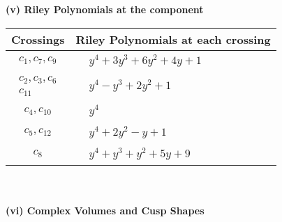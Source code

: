 \documentclass[1p]{elsarticle_modified}
\theoremstyle{definition}
\begin{document}
\newpage\renewcommand{\arraystretch}{1}
\flushleft \textbf{(v) Riley Polynomials at the component}\newline \\
\begin{tabular}{m{50pt}|m{274pt}}
Crossings & \hspace{64pt}Riley Polynomials at each crossing \\
\hline $$\begin{aligned}c_{1},c_{7},c_{9}\end{aligned}$$&$\begin{aligned}
&y^4+3 y^3+6 y^2+4 y+1
\end{aligned}$\\
\hline $$\begin{aligned}c_{2},c_{3},c_{6}\\c_{11}\end{aligned}$$&$\begin{aligned}
&y^4- y^3+2 y^2+1
\end{aligned}$\\
\hline $$\begin{aligned}c_{4},c_{10}\end{aligned}$$&$\begin{aligned}
&y^4
\end{aligned}$\\
\hline $$\begin{aligned}c_{5},c_{12}\end{aligned}$$&$\begin{aligned}
&y^4+2 y^2- y+1
\end{aligned}$\\
\hline $$\begin{aligned}c_{8}\end{aligned}$$&$\begin{aligned}
&y^4+y^3+y^2+5 y+9
\end{aligned}$\\
\hline
\end{tabular}\\~\\
\newpage\flushleft \textbf{(vi) Complex Volumes and Cusp Shapes}
\end{document}
